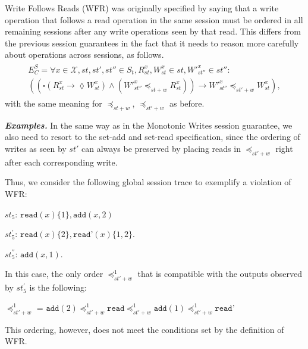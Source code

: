 \documentclass[journal,compsoc]{IEEEtran}
\begin{document}
Write Follows Reads (WFR)  was originally specified by saying that a write operation that follows a read operation in the same session must be ordered in all remaining sessions after any write operations seen by that read. This differs from the previous session guarantees in the fact that it needs to reason more carefully about operations across sessions, as follows. \\
 \begin{align}\label{eqn:WFR}
\begin{split}
   E^S_C =    \forall x \in \mathcal{X}, \mathit{st}, \mathit{st'}, \mathit{st''} \in \mathit{S_t}, R_\mathit{st}^x,  W_\mathit{st}^x \in \mathit{st}, W'^x_\mathit{st''} \in \mathit{st''}:  \\
   \left(  \left(
   \square \left( R^x_{\mathit{st}} \rightarrow \lozenge W^x_{\mathit{st}} \right)
   \wedge
   \left(  W'^x_\mathit{st''} \preccurlyeq_{\mathit{st}+w} R^x_{\mathit{st}} \right)
   \right)
 \rightarrow
W'^x_{\mathit{st}''} \preccurlyeq_{\mathit{st'}+w} W_{\mathit{st}}^x \right),
\end{split}
  \end{align}
with the same meaning for $\preccurlyeq_{\mathit{st}+w}$, $\preccurlyeq_{\mathit{st}'+w}$ as before.


\noindent \emph{\textbf{Examples.}}
In the same way as in the Monotonic Writes session guarantee, we also need to resort to the set-add and set-read specification, since the ordering of writes as seen by $st'$ can always be preserved by placing reads in $\preccurlyeq_{\mathit{st'}+w}$ right after each corresponding write.

Thus, we consider the following global session trace to exemplify a violation of WFR:


 $\mathit{st}_5$: $\texttt{read}(x){\{1\}},\texttt{add}(x,2)$

$\mathit{st}_5^{'}$: $\texttt{read}(x){\{2\}},\texttt{read'}(x){\{1,2\}}$.

$\mathit{st}_5^{''}$: $\texttt{add}(x,1)$.

In this case, the only order $\preccurlyeq_{\mathit{st'}+w}^1$ that is compatible with the outputs observed by $\mathit{st}_5^{'}$ is the following:

  \noindent $\preccurlyeq_{\mathit{st'}+w}^1$ = $\texttt{add}(2) \preccurlyeq_{\mathit{st'}+w}^1 \texttt{read}
  \preccurlyeq_{\mathit{st'}+w}^1  \texttt{add}(1) \preccurlyeq_{\mathit{st'}+w}^1 \texttt{read'}$

This ordering, however, does not meet the conditions set by the definition of WFR.
\end{document}
